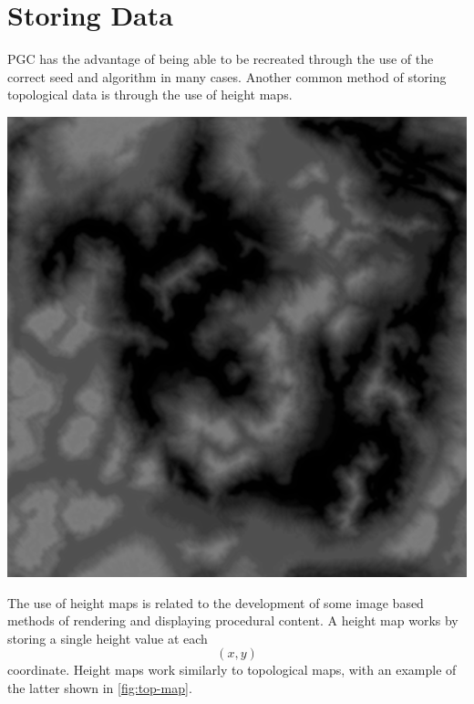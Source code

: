 \documentclass[10pt]{report}
\begin{document}
	\vspace{10pt}
	\let\clearpage\relax
	\chapter{Storing Data} \label{chap:storing_data}
	
		PGC has the advantage of being able to be recreated through the use of the correct seed and algorithm in many cases. Another common method of storing topological data is through the use of height maps. 
		
		\begin{minipage}{\textwidth}
			\centering
			\includegraphics[scale=.5]{D10}
			\label{fig:height-map}
		\end{minipage}
		
		The use of height maps is related to the development of some image based methods of rendering and displaying procedural content. A height map works by storing a single height value at each \[(x,y)\] coordinate. Height maps work similarly to topological maps, with an example of the latter shown in \autoref{fig:top-map}.
		
\end{document}

